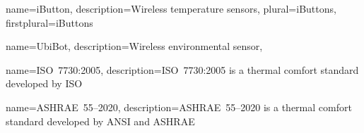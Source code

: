 \usepackage[nonumberlist,nogroupskip]{glossaries}




{
name={iButton\textsuperscript{\tiny\textregistered}},
description={Wireless temperature sensors},
plural={iButtons\textsuperscript{\tiny\textregistered}},
firstplural={iButtons\textsuperscript{\tiny\textregistered}}
}

{
name={UbiBot\textsuperscript{\tiny\textregistered}},
description={Wireless environmental sensor},
}

{
name={ISO~7730:2005},
description={ISO~7730:2005 is a thermal comfort standard developed by ISO}
}

{
name={ASHRAE~55--2020},
description={ASHRAE~55--2020 is a thermal comfort standard developed by ANSI and ASHRAE}
}

\makenoidxglossaries
